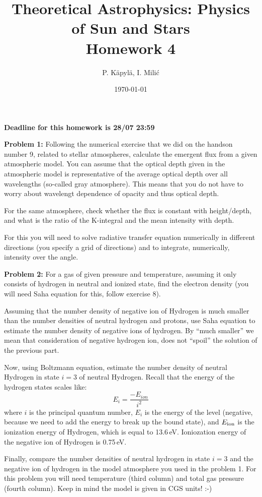 \documentclass[12pt]{article}
\title{Theoretical Astrophysics: Physics of Sun and Stars\\
Homework 4}
\author{P. K\"{a}pyl\"{a}, I. Mili\'{c}}
\date{\today}
\begin{document}
\maketitle

\textbf{Deadline for this homework is \textbf{28}/07 23:59}

{\bf Problem 1:} Following the numerical exercise that we did on the
handson number 9, related to stellar atmospheres, calculate the
emergent flux from a given atmospheric model. You can assume that the
optical depth given in the atmospheric model is representative of the
average optical depth over all wavelengths (so-called gray
atmosphere). This means that you do not have to worry about wavelengt
dependence of opacity and thus optical depth.

For the same atmosphere, check whether the flux is constant with
height/depth, and what is the ratio of the K-integral and the mean
intensity with depth.

For this you will need to solve radiative transfer equation
numerically in different directions (you specify a grid of directions)
and to integrate, numerically, intensity over the angle.

{\bf Problem 2:} For a gas of given pressure and temperature, assuming
it only consists of hydrogen in neutral and ionized state, find the
electron density (you will need Saha equation for this, follow
exercise 8).

Assuming that the number density of negative ion of Hydrogen is
much smaller than the number densities of neutral hydrogen and protons, use Saha
equation to estimate the number density of negative ions of hydrogen. By ``much smaller'' we mean that consideration of negative hydrogen ion, does not ``spoil'' the solution of the previous part. 

Now, using Boltzmann equation, estimate the number density of neutral
Hydrogen in state $i=3$ of neutral Hydrogen. Recall that the energy of
the hydrogen states scales like:
\begin{equation}
E_i = \frac{-E_{ion}}{i^2}
\end{equation}
where $i$ is the principal quantum number, $E_i$ is the energy of the
level (negative, because we need to add the energy to break up the
bound state), and $E_{\rm ion}$ is the ionization energy of Hydrogen,
which is equal to 13.6\,eV. Ioniozation energy of the negative ion of
Hydrogen is 0.75\,eV.

Finally, compare the number densities of neutral hydrogen in state
$i=3$ and the negative ion of hydrogen in the model atmosphere you
used in the problem 1. For this problem you will need temperature
(third column) and total gas pressure (fourth column). Keep in mind
the model is given in CGS units! :-)
\end{document}
